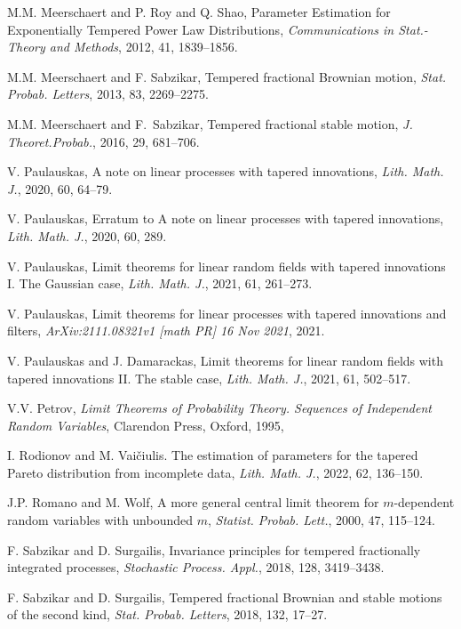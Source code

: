 \documentclass[12pt]{article}
\newcommand{\halmos}{\vspace{3mm} \hfill \mbox{$\Box$}\\[2mm]}
\theoremstyle{plain}
\theoremstyle{definition}
\begin{document}
\begin{enumerate}
M.M. Meerschaert and P. Roy and Q. Shao, Parameter Estimation for Exponentially Tempered Power Law Distributions,
{\em Communications in Stat.- Theory and Methods}, 2012, {41}, 1839--1856.


M.M. Meerschaert and F. Sabzikar, Tempered fractional {Brownian} motion,
{\em Stat. Probab. Letters}, 2013, {83}, 2269--2275.

M.M. Meerschaert and F.~Sabzikar, Tempered fractional stable motion,
 {\em J. Theoret.Probab.}, 2016, {29}, 681--706.



V. Paulauskas,  A note on linear processes with tapered innovations,
{\em Lith. Math. J.}, 2020, {60}, 64--79.

V. Paulauskas, Erratum to {A} note on linear processes with tapered innovations,
{\em Lith. Math. J.}, 2020, {60}, 289.


V. Paulauskas, Limit theorems for linear random fields with tapered innovations I. The Gaussian case,
{\em Lith. Math. J.}, 2021, {61}, 261--273.

V. Paulauskas, Limit theorems for linear processes with tapered innovations and filters,
 {\em ArXiv:2111.08321v1 [math PR] 16 Nov 2021}, 2021.


V. Paulauskas and J. Damarackas, Limit theorems for linear random fields with tapered innovations II. The stable case,
{\em Lith. Math. J.}, 2021, {61}, 502--517.


V.V. Petrov, {\em Limit Theorems of Probability Theory. Sequences of Independent Random Variables}, Clarendon Press, Oxford, 1995,

I. Rodionov and M. Vai\v{c}iulis.
 The estimation of parameters for the tapered {Pareto} distribution from incomplete data,
 {\em Lith. Math. J.}, 2022, {62}, 136--150.

J.P. Romano and M. Wolf, A more general central limit theorem for $m$-dependent random variables with unbounded $m$,
 {\em Statist. Probab. Lett.}, 2000, {47}, 115--124.


F. Sabzikar and D. Surgailis, Invariance principles for tempered fractionally integrated processes,
 {\em Stochastic Process. Appl.}, 2018, {128}, 3419--3438.


F. Sabzikar and D. Surgailis, Tempered fractional Brownian and stable motions of the second kind,
{\em Stat. Probab. Letters}, 2018, {132}, 17--27.


\end{enumerate}

%

%
%
\end{document}

